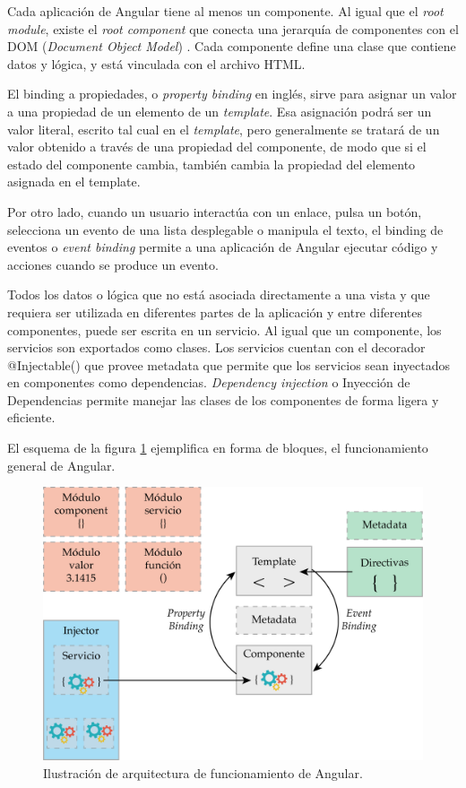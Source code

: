 Cada aplicación de Angular tiene al menos un componente. Al igual que el \textit{root module}, existe el \textit{root component} que conecta una jerarquía de componentes con el DOM (\textit{Document Object Model}) \citep{WEBSITE:31}.  Cada componente define una clase que contiene datos y lógica, y está vinculada con el archivo HTML.

El binding a propiedades, o \textit{property binding} en inglés, sirve para asignar un valor a una propiedad de un elemento de un \textit{template}. Esa asignación podrá ser un valor literal, escrito tal cual en el \textit{template}, pero generalmente se tratará de un valor obtenido a través de una propiedad del componente, de modo que si el estado del componente cambia, también cambia la propiedad del elemento asignada en el template.

Por otro lado, cuando un usuario interactúa con un enlace, pulsa un botón, selecciona un evento de una lista desplegable o manipula el texto, el binding de eventos o \textit{event binding} permite a una aplicación de Angular ejecutar código y acciones cuando se produce un evento.

Todos los datos o lógica que no está asociada directamente a una vista y que requiera ser utilizada en diferentes partes de la aplicación y entre diferentes componentes, puede ser escrita en un servicio. Al igual que un componente, los servicios son exportados como clases. Los servicios cuentan con el decorador @Injectable() que provee metadata que permite que los servicios sean inyectados en componentes como dependencias.  \textit{Dependency injection} o Inyección de Dependencias permite manejar las clases de los componentes de forma ligera y eficiente. 

El esquema de la figura \ref{fig:esquema-angular} ejemplifica en forma de bloques, el funcionamiento general de Angular.

\begin{figure}[htpb]
	\centering
	\includegraphics[scale=.7]{./Figures/angular-esquema.png}
	\caption[Arquitectura de funcionamiento de Angular ]{Ilustración de arquitectura de funcionamiento de Angular\protect\footnotemark.}
	\label{fig:esquema-angular}
\end{figure}

